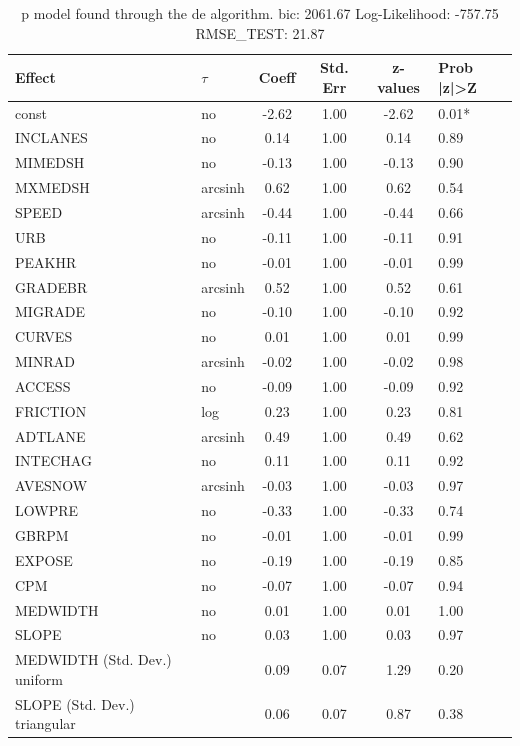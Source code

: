 \begin{table}
	\caption{p model found through the de algorithm. bic: 2061.67 Log-Likelihood: -757.75 RMSE_TEST: 21.87}
	\begin{center}
		\begin{tabular}{|l|l|c|c|c|l|}
			\hline
			Effect & $\tau$ & Coeff & Std. Err & z-values & Prob |z|>Z \\
			\hline
			const & no & -2.62 & 1.00 & -2.62 & 0.01* \\
			\hline
			INCLANES & no & 0.14 & 1.00 & 0.14 & 0.89 \\
			\hline
			MIMEDSH & no & -0.13 & 1.00 & -0.13 & 0.90 \\
			\hline
			MXMEDSH & arcsinh & 0.62 & 1.00 & 0.62 & 0.54 \\
			\hline
			SPEED & arcsinh & -0.44 & 1.00 & -0.44 & 0.66 \\
			\hline
			URB & no & -0.11 & 1.00 & -0.11 & 0.91 \\
			\hline
			PEAKHR & no & -0.01 & 1.00 & -0.01 & 0.99 \\
			\hline
			GRADEBR & arcsinh & 0.52 & 1.00 & 0.52 & 0.61 \\
			\hline
			MIGRADE & no & -0.10 & 1.00 & -0.10 & 0.92 \\
			\hline
			CURVES & no & 0.01 & 1.00 & 0.01 & 0.99 \\
			\hline
			MINRAD & arcsinh & -0.02 & 1.00 & -0.02 & 0.98 \\
			\hline
			ACCESS & no & -0.09 & 1.00 & -0.09 & 0.92 \\
			\hline
			FRICTION & log & 0.23 & 1.00 & 0.23 & 0.81 \\
			\hline
			ADTLANE & arcsinh & 0.49 & 1.00 & 0.49 & 0.62 \\
			\hline
			INTECHAG & no & 0.11 & 1.00 & 0.11 & 0.92 \\
			\hline
			AVESNOW & arcsinh & -0.03 & 1.00 & -0.03 & 0.97 \\
			\hline
			LOWPRE & no & -0.33 & 1.00 & -0.33 & 0.74 \\
			\hline
			GBRPM & no & -0.01 & 1.00 & -0.01 & 0.99 \\
			\hline
			EXPOSE & no & -0.19 & 1.00 & -0.19 & 0.85 \\
			\hline
			CPM & no & -0.07 & 1.00 & -0.07 & 0.94 \\
			\hline
			MEDWIDTH & no & 0.01 & 1.00 & 0.01 & 1.00 \\
			\hline
			SLOPE & no & 0.03 & 1.00 & 0.03 & 0.97 \\
			\hline
			MEDWIDTH (Std. Dev.) uniform &  & 0.09 & 0.07 & 1.29 & 0.20 \\
			\hline
			SLOPE (Std. Dev.) triangular &  & 0.06 & 0.07 & 0.87 & 0.38 \\
			\hline
		\end{tabular}
	\end{center}
\end{table}